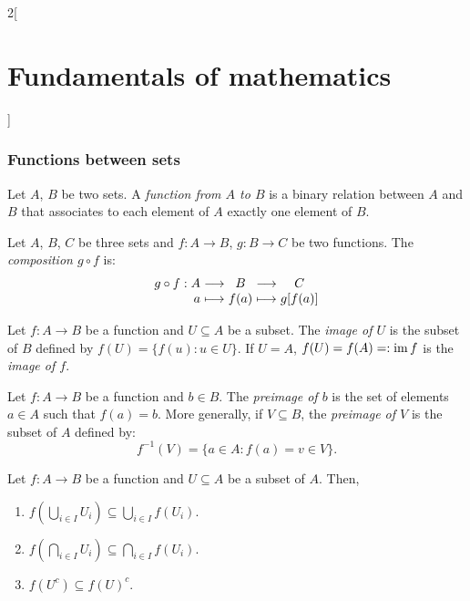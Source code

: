 \documentclass[../../../main.tex]{subfiles}
\begin{document}
\begin{multicols}{2}[\section{Fundamentals of mathematics}]
\subsubsection*{Functions between sets}
\begin{definition}
    Let $A$, $B$ be two sets. A \textit{function from $A$ to $B$} is a binary relation between $A$ and $B$ that associates to each element of $A$ exactly one element of $B$.
\end{definition}
\begin{definition}
    Let $A$, $B$, $C$ be three sets and $f:A\rightarrow B$, $g:B\rightarrow C$ be two functions. The \textit{composition $g\circ f$} is:
    $$\begin{array}{r@{\hspace{0.5\tabcolsep}}c@{\hspace{0.5\tabcolsep}}c@{\hspace{0.5\tabcolsep}}c@{\hspace{0.5\tabcolsep}}c}
        g\circ f:A&\longrightarrow & B & \longrightarrow &C\\
        a&\longmapsto & f(a) & \longmapsto & g[f(a)]
    \end{array}$$
\end{definition}
\begin{definition}
    Let $f:A\rightarrow B$ be a function and $U\subseteq A$ be a subset. The \textit{image of $U$} is the subset of $B$ defined by $f(U)=\{f(u): u\in U\}$. If $U=A$, $f(U)=f(A)=:\operatorname{im} f$ is the \textit{image of $f$}.
\end{definition}
\begin{definition}
    Let $f:A\rightarrow B$ be a function and $b\in B$. The \textit{preimage of $b$} is the set of elements $a\in A$ such that $f(a)=b$. More generally, if $V\subseteq B$, the \textit{preimage of $V$} is the subset of $A$ defined by: $$f^{-1}(V)=\{a\in A: f(a)=v\in V\}.$$
\end{definition}
\begin{prop}
    Let $f:A\rightarrow B$ be a function and $U\subseteq A$ be a subset of $A$. Then,
    \begin{enumerate}
        \item $f\left(\bigcup_{i\in I}U_i\right)\subseteq\bigcup_{i\in I}f(U_i)$.
        \item $f\left(\bigcap_{i\in I}U_i\right)\subseteq\bigcap_{i\in I}f(U_i)$.
        \item $f(U^c)\subseteq f(U)^c$.
    \end{enumerate}
\end{prop}

\end{multicols}
\end{document}
